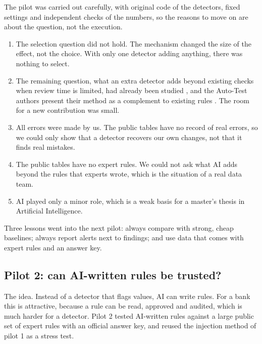 \documentclass[11pt,a4paper]{article}
\begin{document}
The pilot was carried out carefully, with original code of the detectors, fixed settings and independent checks of the numbers, so the reasons to move on are about the question, not the execution.
\begin{enumerate}
\item The selection question did not hold. The mechanism changed the size of the effect, not the choice. With only one detector adding anything, there was nothing to select.
\item The remaining question, what an extra detector adds beyond existing checks when review time is limited, had already been studied \cite{abedjan,rein}, and the Auto-Test authors present their method as a complement to existing rules \cite{autotest}. The room for a new contribution was small.
\item All errors were made by us. The public tables have no record of real errors, so we could only show that a detector recovers our own changes, not that it finds real mistakes.
\item The public tables have no expert rules. We could not ask what AI adds beyond the rules that experts wrote, which is the situation of a real data team.
\item AI played only a minor role, which is a weak basis for a master's thesis in Artificial Intelligence.
\end{enumerate}
Three lessons went into the next pilot: always compare with strong, cheap baselines; always report alerts next to findings; and use data that comes with expert rules and an answer key.

\subsection{Pilot 2: can AI-written rules be trusted?}
\label{sec:pilot2}

The idea. Instead of a detector that flags values, AI can write rules. For a bank this is attractive, because a rule can be read, approved and audited, which is much harder for a detector. Pilot 2 tested AI-written rules against a large public set of expert rules with an official answer key, and reused the injection method of pilot 1 as a stress test.
\end{document}
